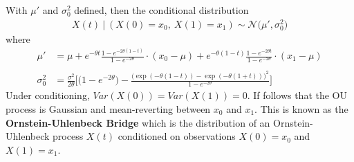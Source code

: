 \documentclass{article}
\begin{document}
With $\mu'$ and $\sigma_0^2$ defined, then the conditional distribution
\begin{align*}
    X(t)~\Big|~(X(0)=x_0,~X(1)=x_1)\sim \mathcal{N}\Big(\mu',\sigma_0^2\Big)
\end{align*}
where
\begin{align*}
    \mu'&=\mu+e^{-\theta t}\frac{1-e^{-2\theta(1-t)}}{1-e^{-2\theta}}\cdot (x_0-\mu)+e^{-\theta (1-t)}\frac{1-e^{-2\theta t}}{1-e^{-2\theta}}\cdot (x_1-\mu)\\
    \\
    \sigma_0^2&=\frac{\sigma^2}{2\theta}\Bigg[\Big(1-e^{-2\theta }\Big)-\frac{\Big(\exp(-\theta(1-t))-\exp(-\theta(1+t))\Big)^2}{1-e^{-2\theta}}\Bigg]
\end{align*}
Under conditioning, $Var(X(0))=Var(X(1))=0$. If follows that the OU process is Gaussian and mean-reverting between $x_0$ and $x_1$. This is known as the \textbf{Ornstein-Uhlenbeck Bridge} which is the distribution of an Ornstein-Uhlenbeck process $X(t)$ conditioned on observations $X(0)=x_0$ and $X(1)=x_1$.
\end{document}
